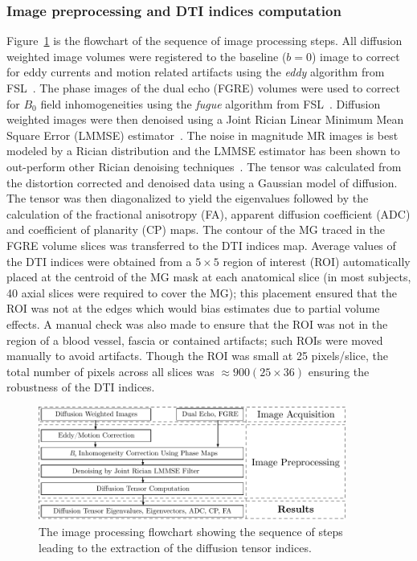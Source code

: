\subsubsection{Image preprocessing and DTI indices computation}
Figure~\ref{fig: DTI-flowchart} is the flowchart of the sequence of image processing steps.
All diffusion weighted image volumes were registered to the baseline ($b=0$) image to correct for eddy currents and motion related artifacts using the \textit{eddy} algorithm from FSL~\cite{RND23}. 
The phase images of the dual echo (FGRE) volumes were used to correct for $B_0$ field inhomogeneities using the \textit{fugue} algorithm from FSL~\cite{RND23}.
Diffusion weighted images were then denoised using a Joint Rician Linear Minimum Mean Square Error (LMMSE) estimator~\cite{RND24}. 
The noise in magnitude MR images is best modeled by a Rician distribution and the LMMSE estimator has been shown to out-perform other Rician denoising techniques~\cite{RND25}.
The tensor was calculated from the distortion corrected and denoised data using a Gaussian model of diffusion.
The tensor was then diagonalized to yield the eigenvalues followed by the calculation of the fractional anisotropy (FA), apparent diffusion coefficient (ADC) and coefficient of planarity (CP) maps. 
The contour of the MG traced in the FGRE volume slices was transferred to the DTI indices map.
Average values of the DTI indices were obtained from a $5 \times 5$ region of interest (ROI) automatically placed at the centroid of the MG mask at each anatomical slice (in most subjects, 40 axial slices were required to cover the MG); this placement ensured that the ROI was not at the edges which would bias estimates due to partial volume effects. 
A manual check was also made to ensure that the ROI was not in the region of a blood vessel, fascia or contained artifacts; such ROIs were moved manually to avoid artifacts. 
Though the ROI was small at 25 pixels/slice, the total number of pixels across all slices was $\approx 900 (25 \times 36)$ ensuring the robustness of the DTI indices. 
\begin{figure}[!htb]
\vspace{+0.2cm}
\centering
\includegraphics[width=0.9\textwidth]{Figures/DTI_flowchart.pdf}
\caption[The image processing flowchart showing the sequence of steps leading to the extraction of the diffusion tensor indices]{The image processing flowchart showing the sequence of steps leading to the extraction of the diffusion tensor indices.}
\label{fig: DTI-flowchart}
\end{figure}

